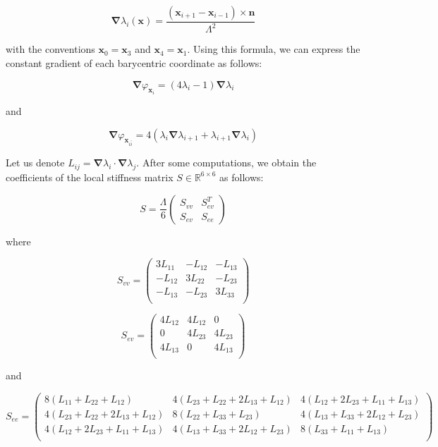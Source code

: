 \documentclass{article}
\theoremstyle{definition}
\theoremstyle{proposition}
\theoremstyle{theorem}
\theoremstyle{remark}
\theoremstyle{corollary}  %
\theoremstyle{exercise}
\theoremstyle{lemma}
\begin{document}
$$\bm \nabla \lambda_i(\bm x) = \frac{(\bm x_{i+1} - \bm x_{i-1}) \times \bm n}{\Lambda^2}$$

with the conventions $\bm x_{0} = \bm x_3$ and $\bm x_{4} = \bm x_1$. Using this formula, we can express the constant gradient of each barycentric coordinate as follows:

$$\bm \nabla \varphi_{\bm x_i} = (4\lambda_i - 1)\bm \nabla \lambda_i$$

and 

$$\bm \nabla \varphi_{\bm x_{i\bar{i}}} = 4(\lambda_i \bm \nabla \lambda_{i+1} + \lambda_{i+1} \bm \nabla \lambda_{i})$$

Let us denote $L_{ij} = \bm \nabla \lambda_i \cdot \bm \nabla \lambda_j$. After some computations, we obtain the coefficients of the local stiffness matrix $S \in \mathbb{R}^{6 \times 6}$ as follows:

$$
S = \frac{\Lambda}{6}
\begin{pmatrix}
S_{vv} & S_{ev}^T \\
S_{ev} & S_{ee}
\end{pmatrix}
$$

where 

$$S_{vv} = \begin{pmatrix}
 3L_{11} & -L_{12} & -L_{13} \\
-L_{12} & 3L_{22} & -L_{23} \\
-L_{13} & -L_{23} & 3L_{33} \\
\end{pmatrix}$$

$$S_{ev} =  \begin{pmatrix}
 4L_{12} & 4L_{12} & 0 \\
  0 &  4L_{23} & 4L_{23} \\
4L_{13} & 0 &  4L_{13}\\
\end{pmatrix}$$

and 

$$S_{ee} = \begin{pmatrix}
8(L_{11} + L_{22} + L_{12}) & 4(L_{23} + L_{22} + 2L_{13} + L_{12}) & 4(L_{12} + 2L_{23} + L_{11} + L_{13}) \\
4(L_{23} + L_{22} + 2L_{13} + L_{12}) &  8(L_{22} + L_{33} + L_{23}) & 4(L_{13} + L_{33} + 2L_{12} + L_{23}) \\
4(L_{12} + 2L_{23} + L_{11} + L_{13}) & 4(L_{13} + L_{33} + 2L_{12} + L_{23}) &  8(L_{33} + L_{11} + L_{13})\\
\end{pmatrix}$$
\end{document}
